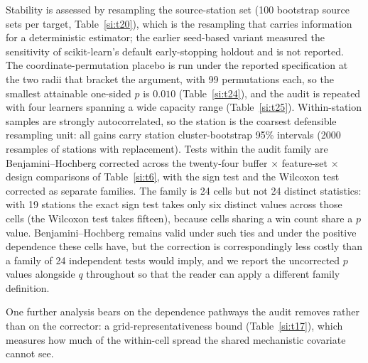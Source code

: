 \documentclass[11pt]{article}
\begin{document}
Stability is assessed by resampling the source-station set (100 bootstrap source sets per target,
Table~\ref{si:t20}), which is the resampling that carries information for a deterministic
estimator; the earlier seed-based variant measured the sensitivity of scikit-learn's default
early-stopping holdout and is not reported. The coordinate-permutation placebo is run under the
reported specification at the two radii that bracket the argument, with 99 permutations each, so
the smallest attainable one-sided $p$ is $0.010$ (Table~\ref{si:t24}), and the audit is repeated
with four learners spanning a wide capacity range (Table~\ref{si:t25}). Within-station samples are
strongly autocorrelated, so the station is the coarsest defensible resampling unit: all gains carry
station cluster-bootstrap 95\% intervals (2000 resamples of stations with replacement). Tests
within the audit family are Benjamini--Hochberg corrected across the twenty-four buffer $\times$
feature-set $\times$ design comparisons of Table~\ref{si:t6}, with the sign test and the Wilcoxon
test corrected as separate families. The family is 24 cells but not 24 distinct statistics: with 19
stations the exact sign test takes only six distinct values across those cells (the Wilcoxon test
takes fifteen), because cells sharing a win count share a $p$ value. Benjamini--Hochberg remains
valid under such ties and under the positive dependence these cells have, but the correction is
correspondingly less costly than a family of 24 independent tests would imply, and we report the
uncorrected $p$ values alongside $q$ throughout so that the reader can apply a different family
definition.

One further analysis bears on the dependence pathways the audit removes rather than on the
corrector: a grid-representativeness bound (Table~\ref{si:t17}), which measures how much of the
within-cell spread the shared mechanistic covariate cannot see.
\end{document}
